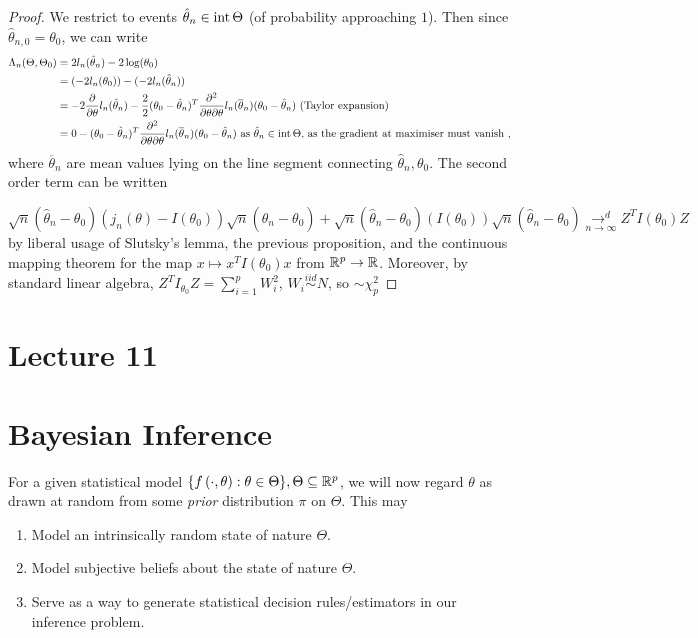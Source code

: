 \documentclass[a4paper]{article}
\begin{document}
\begin{proof}
	We restrict to events $\hat{\theta}_n \in\operatorname{int} \Theta$ (of probability approaching $1$). Then since $\hat{\theta}_{n,0} = \theta_0$, we can write 
	\begin{align*}
		\Lambda_n(\Theta,\Theta_0) &= 2l_n(\hat{\theta}_n) - 2\log(\theta_0) \\
		&= (-2l_n(\theta_0)) -(-2l_n(\hat{\theta}_n)) \\
		&= -2 \frac{\partial }{\partial \theta} l_n(\hat{\theta}_n) - \frac{2}{2} (\theta_0 - \hat{\theta}_n)^{T} \frac{\partial ^2}{\partial \theta\partial\theta} l_n(\overline{\theta}_n)(\theta_0 - \hat{\theta}_n) \text{ (Taylor expansion)} \\ 
		&= 0 - (\theta_0 - \hat{\theta}_n)^{T} \frac{\partial ^2}{\partial \theta\partial\theta} l_n(\overline{\theta}_n)(\theta_0 - \hat{\theta}_n) \text{ as $\hat{\theta}_n \in\operatorname{int} \Theta$, as the gradient at maximiser must vanish }
	,\end{align*}
	where $\overline{\theta}_n$ are mean values lying on the line segment connecting $\hat{\theta}_n, \theta_0$. The second order term can be written

\[
	\sqrt{n}(\hat{\theta}_n - \theta_0)(j_n(\theta) - I(\theta_0))\sqrt{n}(\hat{\theta}_n - \theta_0) + \sqrt{n}(\hat{\theta}_n - \theta_0)(I(\theta_0))\sqrt{n}(\hat{\theta}_n - \theta_0) \underset{n\to \infty}{\to ^{d}} Z^{T}I(\theta_0)Z
		\]
by liberal usage of Slutsky's lemma, the previous proposition, and the continuous mapping theorem for the map $x \mapsto x^{T}I(\theta_0)x$ from $\mathbb{R}^{p} \to \mathbb{R}$. Moreover, by standard linear algebra, $Z^{T}I_{\theta_0}Z = \sum_{i=1}^{p} W_{i}^2$, $W_i \stackrel{iid}{\sim} N$, so $\sim \chi^2_{p}$ 
\end{proof}

\section*{Lecture 11}

\section{Bayesian Inference}

For a given statistical model $\{f\left( \cdot , \theta \right) : \theta \in \Theta \}, \Theta \subseteq \mathbb{R}^{p}$, we will now regard $\theta$ as drawn at random from some \textit{prior} distribution $\pi$ on $\Theta$. This may

\begin{enumerate}[label=\roman*)]
	\item Model an intrinsically random state of nature $\Theta$.
	\item Model subjective beliefs about the state of nature $\Theta$.
	\item Serve as a way to generate statistical decision rules/estimators in our inference problem.
\end{enumerate}
\end{document}

